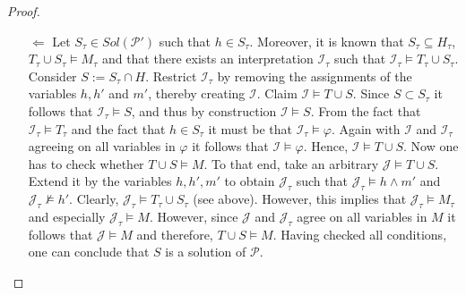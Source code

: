 \documentclass [11pt]{article}
\newcommand{\nmodels}{\not\models}
\begin{document}
\begin{proof}
\begin{itemize}
\item[$\Leftarrow$]  Let $S_{\tau} \in Sol(\mathcal{P}')$ such that $h \in S_{\tau}$. Moreover, it is known that $S_{\tau} \subseteq H_{\tau}$, $T_{\tau} \cup S_{\tau} \models M_{\tau}$ and that there exists an interpretation $\mathcal{I}_{\tau}$ such that $\mathcal{I}_{\tau} \models T_{\tau} \cup S_{\tau}$. Consider $S:=S_{\tau} \cap H$.  Restrict $\mathcal{I}_{\tau}$ by removing the assignments of the variables $h,h'$ and $m'$, thereby creating $\mathcal{I}$. Claim $\mathcal{I} \models T\cup S$. Since $S \subset S_{\tau}$ it follows that $\mathcal{I}_{\tau} \models S$, and thus by construction $\mathcal{I} \models S$. From the fact that $\mathcal{I}_{\tau} \models T_{\tau}$ and the fact that $h \in S_{\tau}$ it must be that $\mathcal{I}_{\tau} \models \varphi$. Again with $\mathcal{I}$ and $\mathcal{I}_{\tau}$ agreeing on all variables in $\varphi$ it follows that
$\mathcal{I} \models \varphi$. Hence, $\mathcal{I} \models T \cup S$. Now one has to check whether $T \cup S \models M$. To that end, take an arbitrary $\mathcal{J} \models T \cup S$. Extend it by the variables $h,h',m'$ to obtain $\mathcal{J}_{\tau}$ such that $\mathcal{J}_{\tau} \models h \land m'$ and  $\mathcal{J}_{\tau} \nmodels h'$. Clearly, $\mathcal{J}_{\tau} \models T_{\tau} \cup S_{\tau}$ (see above). However, this implies that $\mathcal{J}_{\tau} \models M_{\tau}$ and 
especially $\mathcal{J}_{\tau} \models M$. However, since $\mathcal{J}$ and $\mathcal{J}_{\tau}$ agree on all variables in $M$ it follows that $\mathcal{J} \models M$ and therefore, $T \cup S \models M$. Having checked all conditions, one can conclude that $S$ is a solution of $\mathcal{P}$.
\end{itemize}
\end{proof}
\end{document}
